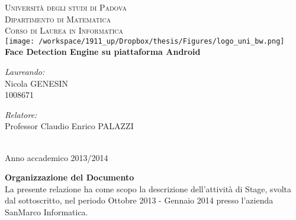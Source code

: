 \documentclass[10pt, a4paper, oneside]{Thesis} %
\begin{document}
\begin{titlepage}
\begin{center}


\vspace*{10 mm}
\textsc{\LARGE Università degli studi di Padova}\\[0.5cm] %
\textsc{\Large Dipartimento di Matematica \\
Corso di Laurea in Informatica}\\[1.0cm] %

\texttt{[image: /workspace/1911\_up/Dropbox/thesis/Figures/logo\_uni\_bw.png]}\\[1.5cm]

{\huge \bfseries Face Detection Engine su piattaforma Android}\\[2.5cm] %
 
\begin{minipage}{0.4\textwidth}
\begin{flushleft} \large
\emph{Laureando:}\\
{Nicola GENESIN \\ 1008671} %
\end{flushleft}
\end{minipage}
\begin{minipage}{0.4\textwidth}
\begin{flushright} \large
\emph{Relatore:} \\
{Professor Claudio Enrico PALAZZI} %
\end{flushright}
\end{minipage}\\[3cm]
 
{\large Anno accademico 2013/2014}\\[4cm] %

\vfill
\end{center}
\end{titlepage}

\clearpage
\newpage
\thispagestyle{empty}
\mbox{}
\clearpage

\vspace*{7cm}

\textbf{Organizzazione del Documento}\\

La presente relazione ha come scopo la descrizione dell'attività di Stage, svolta dal sottoscritto, nel periodo Ottobre 2013 - Gennaio 2014 presso l'azienda SanMarco Informatica. 
\end{document}
